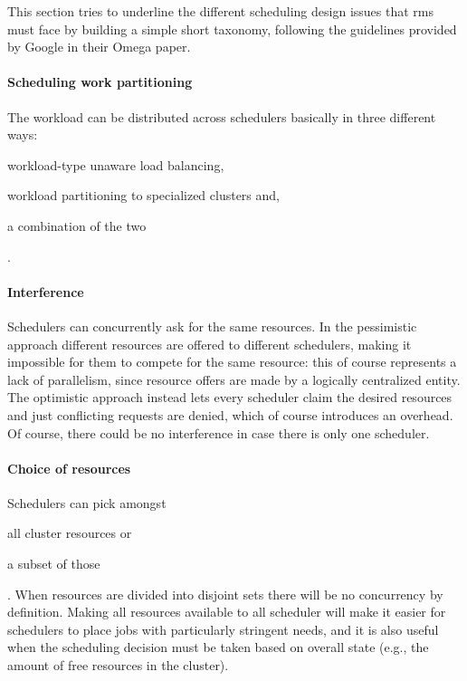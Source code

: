 This section tries to underline the different scheduling design issues that \glspl{rm} must face by building a simple short taxonomy, following the guidelines provided by Google in their Omega \cite{omega} paper.

\paragraph{Scheduling work partitioning}
The workload can be distributed across schedulers basically in three different ways:
\begin{mylist}
    \item workload-type unaware load balancing,
    \item workload partitioning to specialized clusters and,
    \item a combination of the two
\end{mylist}.

\paragraph{Interference}
Schedulers can concurrently ask for the same resources.
In the pessimistic approach different resources are offered to different schedulers, making it impossible for them to compete for the same resource: this of course represents a lack of parallelism, since resource offers are made by a logically centralized entity.
The optimistic approach instead lets every scheduler claim the desired resources and just conflicting requests are denied, which of course introduces an overhead.
Of course, there could be no interference in case there is only one scheduler.

\paragraph{Choice of resources}
Schedulers can pick amongst
\begin{mylist}
    \item all cluster resources or 
    \item a subset of those
\end{mylist}.
When resources are divided into disjoint sets there will be no concurrency by definition.
Making all resources available to all scheduler will make it easier for schedulers to place jobs with particularly stringent needs, and it is also useful when the scheduling decision must be taken based on overall state (e.g., the amount of free resources in the cluster).

